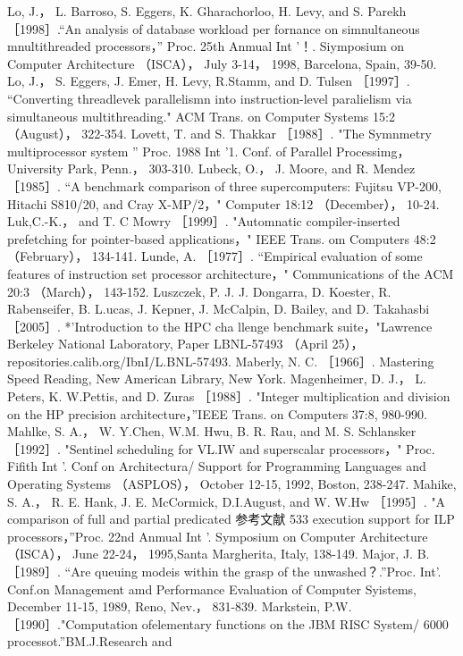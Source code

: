 Lo, J.， L. Barroso, S. Eggers, K. Gharachorloo, H. Levy, and S. Parekh ［1998］.“An analysis of database workload per fornance on
simnultaneous mnultithreaded processors，” Proc. 25th Anmual Int '！. Siymposium on Computer Architecture （ISCA）， July 3-14，
1998, Barcelona, Spain, 39-50.
Lo, J.， S. Eggers, J. Emer, H. Levy, R.Stamm, and D. Tulsen ［1997］. “Converting threadlevek parallelismn into instruction-level
paralielism via simultaneous multithreading." ACM Trans. on Computer Systems 15:2 （August）， 322-354.
Lovett, T. and S. Thakkar ［1988］. "The Symnmetry multiprocessor system ” Proc. 1988 Int '1. Conf. of Parallel Processimg，
University Park, Penn.， 303-310.
Lubeck, O.， J. Moore, and R. Mendez ［1985］. “A benchmark comparison of three supercomputers: Fujitsu VP-200, Hitachi
S810/20, and Cray X-MP/2，" Computer 18:12 （December）， 10-24.
Luk,C.-K.， and T. C Mowry ［1999］. "Automnatic compiler-inserted prefetching for pointer-based applications，" IEEE Trans. om
Computers 48:2 （February）， 134-141.
Lunde, A. ［1977］. “Empirical evaluation of some features of instruction set processor architecture，" Communications of the ACM
20:3 （March）， 143-152.
Luszczek, P. J. J. Dongarra, D. Koester, R. Rabenseifer, B. L.ucas, J. Kepner, J. McCalpin, D. Bailey, and D. Takahasbi ［2005］.
*'Introduction to the HPC cha llenge benchmark suite，"Lawrence Berkeley National Laboratory, Paper LBNL-57493 （April
25）， repositories.calib.org/IbnI/L.BNL-57493.
Maberly, N. C. ［1966］. Mastering Speed Reading, New American Library, New York.
Magenheimer, D. J.， L. Peters, K. W.Pettis, and D. Zuras ［1988］. "Integer multiplication and division on the HP precision
architecture，”IEEE Trans. on Computers 37:8, 980-990.
Mahlke, S. A.， W. Y.Chen, W.M. Hwu, B. R. Rau, and M. S. Schlansker ［1992］. "Sentinel scheduling for VL.IW and superscalar
processors，" Proc. Fifith Int '. Conf on Architectura/ Support for Programming Languages and Operating Systems （ASPLOS），
October 12-15, 1992, Boston, 238-247.
Mahike, S. A.， R. E. Hank, J. E. McCormick, D.I.August, and W. W.Hw ［1995］. "A comparison of full and partial predicated
参考文献
533
execution support for ILP processors，”Proc. 22nd Anmual Int '. Symposium on Computer Architecture （ISCA）， June 22-24，
1995,Santa Margherita, Italy, 138-149.
Major, J. B. ［1989］. “Are queuing modeis within the grasp of the unwashed？.”Proc. Int'. Conf.on Management amd
Performance Evaluation of Computer Syistems, December 11-15, 1989, Reno, Nev.， 831-839.
Markstein, P.W.［1990］."Computation ofelementary functions on the JBM RISC System/ 6000 processot.”BM.J.Research and
